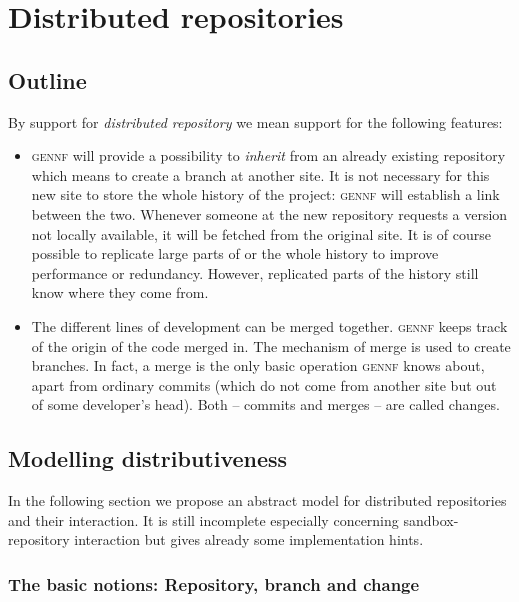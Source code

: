 \documentclass[fleqn, 10pt, a4paper]{article}
\begin{document}
\section{Distributed repositories \label{distrib}}

\subsection{Outline}

By support for \emph{distributed repository} we mean support for the following
features:

\begin{itemize}
\item \textsc{gennf} will provide a possibility to \emph{inherit} from an
already existing repository which means to create a branch
at another site. It is not necessary for this new site to store the
whole history of the project: \textsc{gennf} will establish
a link between the two.
Whenever someone at the new repository requests a version not locally
available, it will be fetched from the original site. It is of course
possible to replicate large parts of or the whole history to improve
performance or redundancy. However, replicated parts of the history still
know where they come from.

\item The different lines of development can be merged together.
\textsc{gennf} keeps track of the origin of the code merged in. The mechanism
of merge is used to create branches. In fact, a merge is the only
basic operation \textsc{gennf} knows about, apart from ordinary commits (which
do not come from another site but out of some developer's head).
Both -- commits and merges -- are called changes.
\end{itemize}

\subsection{Modelling distributiveness}

In the following section we propose an abstract model for distributed
repositories and their interaction. It is still incomplete
especially concerning sandbox-repository interaction but gives already
some implementation hints.

\subsubsection{The basic notions: Repository, branch and change}
\end{document}
